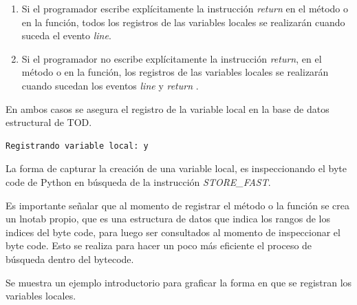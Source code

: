 \documentclass[12pt,legalpaper]{report}
\begin{document}
\begin{enumerate}
	\item Si el programador escribe explícitamente la instrucción \textit{return} en el método o en la función, todos los registros de las variables locales se realizarán cuando suceda el evento \textit{line}.
	\item Si el programador no escribe explícitamente la instrucción \textit{return}, en el método o en la función, los registros de las variables locales se realizarán cuando sucedan los eventos \textit{line} y \textit{return} \cite{bytecode}.
\end{enumerate}

En ambos casos se asegura el registro de la variable local en la base de datos estructural de TOD.

\begin{singlespace}
\begin{lstlisting}[style=Python]
Registrando variable local: y
\end{lstlisting}
\end{singlespace}

La forma de capturar la creación de una variable local, es inspeccionando el byte code de Python en búsqueda de la instrucción \textit{STORE\_FAST}. \cite{bytecode}

Es importante señalar que al momento de registrar el método o la función se crea un lnotab \cite{lnotab} propio, que es una estructura de datos que indica los rangos de los indices del byte code, para luego ser consultados al momento de inspeccionar el byte code.  Esto se realiza para hacer un poco más eficiente el proceso de búsqueda dentro del bytecode.

Se muestra un ejemplo introductorio para graficar la forma en que se registran los variables locales.
\end{document}
